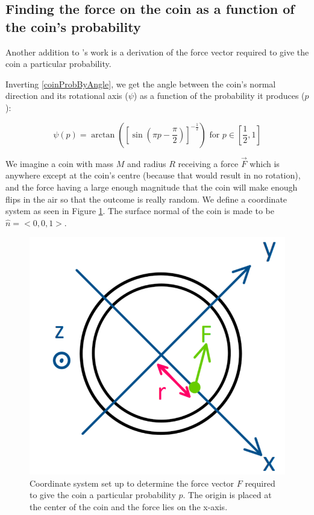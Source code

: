 \documentclass[english,12pt,a4paper,final]{article}
\begin{document}
\subsection{Finding the force on the coin as a function of the coin's probability}

Another addition to \textcite{unfairCoin}'s work is a derivation of the force vector required to give the coin a particular probability.

Inverting \eqref{coinProbByAngle}, we get the angle between the coin's normal direction and its rotational axis ($\psi$) as a function of the probability it produces ($p$):

\begin{equation}\label{coinAngleByProb}
	\psi(p) = \arctan\left(\left[\sin(\pi p-\frac{\pi}{2})\right]^{-\frac{1}{2}}\right) \text{ for } p \in \left[\frac{1}{2}, 1\right]
\end{equation}

We imagine a coin with mass $M$ and radius $R$ receiving a force $\vec{F}$ which is anywhere except at the coin's centre (because that would result in no rotation), and the force having a large enough magnitude that the coin will make enough flips in the air so that the outcome is really random. We define a coordinate system as seen in Figure \ref{fig:coincoords}. The surface normal of the coin is made to be $\hat{n} = <0, 0, 1>$.

\begin{figure}[H]
	\centering
	\includegraphics[width=0.7\linewidth]{coinCoords}
	\caption{Coordinate system set up to determine the force vector $F$ required to give the coin a particular probability $p$. The origin is placed at the center of the coin and the force lies on the x-axis.}
	\label{fig:coincoords}
\end{figure}
\end{document}
